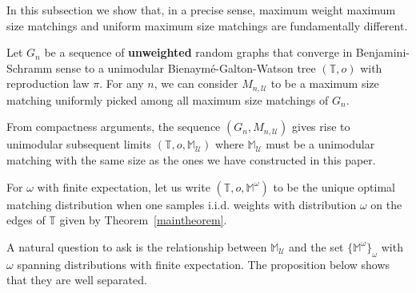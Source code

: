 \documentclass[11pt]{article}
\begin{document}
In this subsection we show that, in a precise sense, maximum weight maximum size matchings and uniform maximum size matchings are fundamentally different.

Let $G_n$ be a sequence of \textbf{unweighted} random graphs that converge in Benjamini-Schramm sense to a unimodular Bienaymé-Galton-Watson tree $(\mathbb{T},o)$ with reproduction law $\pi$.
For any $n$, we can consider $M_{n,\mathcal{U}}$ to be a maximum size matching uniformly picked among all maximum size matchings of $G_n$.

From compactness arguments, the sequence $(G_n,M_{n,\mathcal{U}})$ gives rise to unimodular subsequent limits $(\mathbb{T},o,\mathbb{M}_{\mathcal{U}})$ where $\mathbb{M}_{\mathcal{U}}$ must be a unimodular matching with the same size as the ones we have constructed in this paper.

For $\omega$ with finite expectation, let us write $(\mathbb{T},o,\mathbb{M}^{\omega})$ to be the unique optimal matching distribution when one samples i.i.d. weights with distribution $\omega$ on the edges of $\mathbb{T}$ given by Theorem~\ref{maintheorem}.

A natural question to ask is the relationship between $\mathbb{M}_{\mathcal{U}}$ and the set $\{ \mathbb{M}^{\omega}\}_\omega$ with $\omega$ spanning distributions with finite expectation. The proposition below shows that they are well separated.
\end{document}
